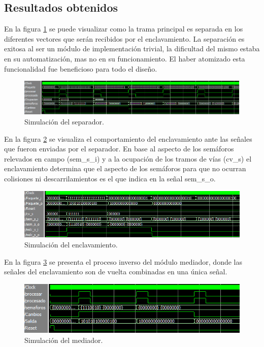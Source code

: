 	\subsection{Resultados obtenidos}
				
		En la figura \ref{fig:Test_Separador} se puede visualizar como la trama principal es separada en los diferentes vectores que serán recibidos por el enclavamiento. La separación es exitosa al ser un módulo de implementación trivial, la dificultad del mismo estaba en su automatización, mas no en su funcionamiento. El haber atomizado esta funcionalidad fue beneficioso para todo el diseño.
		
		\begin{figure}[!hbt]
		\centering
		\includegraphics[scale=0.6]{./Figures/Test/Separador}
			\caption{Simulación del separador.}
			\label{fig:Test_Separador}
		\end{figure}
		
		En la figura \ref{fig:Test_Enclavamiento} se visualiza el comportamiento del enclavamiento ante las señales que fueron enviadas por el separador. En base al aspecto de los semáforos relevados en campo (sem\_s\_i) y a la ocupación de los tramos de vías (cv\_s) el enclavamiento determina que el aspecto de los semáforos para que no ocurran colisiones ni descarrilamientos es el que indica en la señal sem\_s\_o.
		
		\begin{figure}[!hbt]
		\centering
		\includegraphics[scale=0.65]{./Figures/Test/Enclavamiento}
			\caption{Simulación del enclavamiento.}
			\label{fig:Test_Enclavamiento}
		\end{figure}

		
		En la figura \ref{fig:Test_Mediador} se presenta el proceso inverso del módulo mediador, donde las señales del enclavamiento son de vuelta combinadas en una única señal.
		
		\begin{figure}[!hbt]
		\centering
		\includegraphics[scale=0.8]{./Figures/Test/Mediador}
			\caption{Simulación del mediador.}
			\label{fig:Test_Mediador}
		\end{figure}
		
